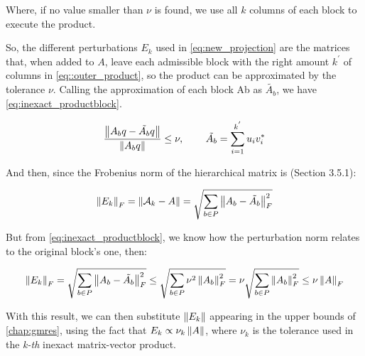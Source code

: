 Where, if no value smaller than $\nu$ is found, we use all $k$ columns of each block to execute the product.

So, the different perturbations $E_{k}$ used in \ref{eq:new_projection} are the matrices that, when added to $A$, leave each admissible block with the right amount $k^{'}$ of columns in \ref{eq::outer_product}, so the product can be approximated by the tolerance $\nu$. Calling the approximation of each block \gls{Ab} as $\tilde{A_{b}}$, we have \ref{eq:inexact_productblock}.

\begin{equation}\label{eq:inexact_productblock}
    \frac{\left\lVert A_{b}q - \tilde{A_{b}}q \right\rVert}{\left\lVert A_{b}q\right\rVert} \leq \nu, \hspace{0.3in} \tilde{A_{b}} = \sum_{i=1} ^{k^{'}} u_{i} v_{i} ^{*}
\end{equation}


And then, since the Frobenius norm of the hierarchical matrix is \cite{hackbusch2015hierarchical}(Section 3.5.1):

\begin{equation}
    \left\lVert E_{k}\right\rVert_{F}= \left\lVert\mathcal{A}_{k} - A\right\rVert = \sqrt{\sum_{b \in P} \left\lVert A_{b} - \tilde{A_{b}}\right\rVert_{F}^{2} }
\end{equation}

But from \autoref{eq:inexact_productblock}, we know how the perturbation norm relates to the original block's one, then:

\begin{equation}
    \left\lVert E_{k}\right\rVert_{F} = \sqrt{\sum_{b \in P} \left\lVert A_{b} - \tilde{A_{b}}\right\rVert_{F}^{2} } \leq \sqrt{\sum_{b\in P}\nu^{2}\left\lVert A_{b}\right\rVert_{F}^{2}} = \nu \sqrt{\sum_{b \in P}\left\lVert A_{b}\right\rVert_{F}^{2}}
    \leq \nu \left\lVert A\right\rVert_{F}
\end{equation}



With this result, we can then substitute $\left\lVert E_{k}\right\rVert$ appearing in the upper bounds of \autoref{chap:gmres}, using the fact that $E_{k}\propto \nu_{k} \left\lVert A\right\rVert$, where $\nu_{k}$ is the tolerance used in the \textit{k-th} inexact matrix-vector product.

